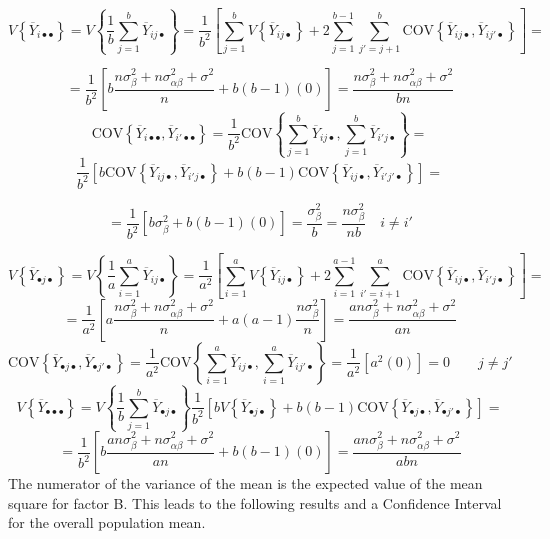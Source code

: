 \documentclass[
]{book}
\begin{document}
\[
V\left\{\overline{Y}_{i\bullet\bullet}\right\} = 
V\left\{\frac{1}{b} \sum_{j=1}^b\overline{Y}_{ij\bullet}\right\} =
\frac{1}{b^2}\left[\sum_{j=1}^b V\left\{\overline{Y}_{ij\bullet}\right\} +
2\sum_{j=1}^{b-1}\sum_{j'=j+1}^b
\mbox{COV}\left\{\overline{Y}_{ij\bullet},\overline{Y}_{ij'\bullet}\right\}\right] =
\]

\[
= \frac{1}{b^2}\left[b\frac{n\sigma_{\beta}^2 + n\sigma_{\alpha\beta}^2 + \sigma^2}{n}
+b(b-1)(0)\right] = \frac{n\sigma_{\beta}^2 + n\sigma_{\alpha\beta}^2 + \sigma^2}{bn}
\] \[
\mbox{COV}\left\{\overline{Y}_{i\bullet\bullet},\overline{Y}_{i'\bullet\bullet}\right\}=
\frac{1}{b^2} \mbox{COV}\left\{\sum_{j=1}^b\overline{Y}_{ij\bullet},\sum_{j=1}^b
\overline{Y}_{i'j\bullet}\right\}=
\] \[
\frac{1}{b^2}\left[ b\mbox{COV}\left\{ \overline{Y}_{ij\bullet},
\overline{Y}_{i'j\bullet}\right\} +
b(b-1)\mbox{COV}\left\{ \overline{Y}_{ij\bullet},
\overline{Y}_{i'j'\bullet}\right\}\right] = 
\]

\[
=\frac{1}{b^2}\left[b\sigma_\beta^2 + b(b-1)(0)\right]=
\frac{\sigma_{\beta}^2}{b}=\frac{n\sigma_{\beta}^2}{nb}
\quad i\neq i' 
\]

\[
V\left\{\overline{Y}_{\bullet j\bullet}\right\} = 
V\left\{\frac{1}{a} \sum_{i=1}^a\overline{Y}_{ij\bullet}\right\} =
\frac{1}{a^2}\left[\sum_{i=1}^a V\left\{\overline{Y}_{ij\bullet}\right\} +
2\sum_{i=1}^{a-1}\sum_{i'=i+1}^a
\mbox{COV}\left\{\overline{Y}_{ij\bullet},\overline{Y}_{i'j\bullet}\right\}\right] =
\] \[
=\frac{1}{a^2}\left[a\frac{n\sigma_{\beta}^2 + n\sigma_{\alpha\beta}^2 + \sigma^2}{n} +
 a(a-1)\frac{n\sigma_{\beta}^2}{n}\right] =
\frac{an\sigma_{\beta}^2 + n\sigma_{\alpha\beta}^2 + \sigma^2}{an}
\] \[
\mbox{COV}\left\{\overline{Y}_{\bullet j\bullet},\overline{Y}_{\bullet j'\bullet}\right\}=
\frac{1}{a^2} \mbox{COV}\left\{\sum_{i=1}^a\overline{Y}_{ij\bullet},\sum_{i=1}^a
\overline{Y}_{ij'\bullet}\right\}=
\frac{1}{a^2}\left[ a^2(0)\right] = 0 \qquad j\neq j'
\] \[
V\left\{\overline{Y}_{\bullet\bullet\bullet}\right\}= 
V\left\{\frac{1}{b}\sum_{j=1}^b\overline{Y}_{\bullet j\bullet}\right\}
\frac{1}{b^2}\left[bV\left\{\overline{Y}_{\bullet j\bullet}\right\} +
b(b-1)\mbox{COV}\left\{\overline{Y}_{\bullet j\bullet},
\overline{Y}_{\bullet j'\bullet}\right\}\right]=
\] \[
=\frac{1}{b^2}\left[b\frac{an\sigma_{\beta}^2 + n\sigma_{\alpha\beta}^2 + \sigma^2}{an} +
 b(b-1)(0)\right] =
\frac{an\sigma_{\beta}^2 + n\sigma_{\alpha\beta}^2 + \sigma^2}{abn} 
\] The numerator of the variance of the mean is the expected value of
the mean square for factor B. This leads to the following results and a
Confidence Interval for the overall population mean.
\end{document}
